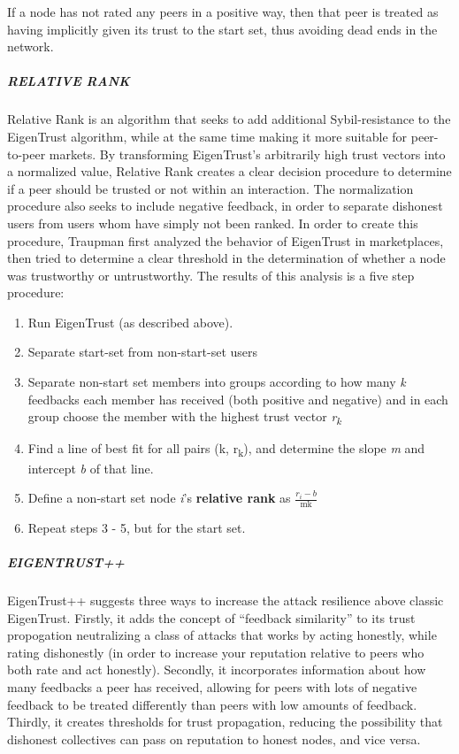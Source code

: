 If a node has not rated any peers in a positive way, then that peer is
treated as having implicitly given its trust to the start set, thus
avoiding dead ends in the network.

\subparagraph{RELATIVE RANK}\label{relative-rank}

Relative Rank is an algorithm that seeks to add additional
Sybil-resistance to the EigenTrust algorithm, while at the same time
making it more suitable for peer-to-peer markets. By transforming
EigenTrust's arbitrarily high trust vectors into a normalized value,
Relative Rank creates a clear decision procedure to determine if a peer
should be trusted or not within an interaction. The normalization
procedure also seeks to include negative feedback, in order to separate
dishonest users from users whom have simply not been ranked. In order to
create this procedure, Traupman first analyzed the behavior of
EigenTrust in marketplaces, then tried to determine a clear threshold in
the determination of whether a node was trustworthy or untrustworthy.
The results of this analysis is a five step procedure:

\begin{enumerate}
\def\labelenumi{\arabic{enumi}.}
\item
  Run EigenTrust (as described above).
\item
  Separate start-set from non-start-set users
\item
  Separate non-start set members into groups according to how many
  \emph{k} feedbacks each member has received (both positive and
  negative) and in each group choose the member with the highest trust
  vector \emph{r\textsubscript{k}}
\item
  Find a line of best fit for all pairs (k, r\textsubscript{k}), and
  determine the slope \emph{m} and intercept \emph{b} of that line.
\item
  Define a non-start set node \emph{i}'s \textbf{relative rank} as
  \(\frac{r_{i} - b}{\text{mk}}\)
\item
  Repeat steps 3 - 5, but for the start
  set.\protect\hypertarget{_bchh8mw27fto}{}{}
\end{enumerate}

\subparagraph{EIGENTRUST++}\label{eigentrust-1}

EigenTrust++ suggests three ways to increase the attack resilience above
classic EigenTrust. Firstly, it adds the concept of ``feedback
similarity'' to its trust propogation neutralizing a class of attacks
that works by acting honestly, while rating dishonestly (in order to
increase your reputation relative to peers who both rate and act
honestly). Secondly, it incorporates information about how many
feedbacks a peer has received, allowing for peers with lots of negative
feedback to be treated differently than peers with low amounts of
feedback. Thirdly, it creates thresholds for trust propagation, reducing
the possibility that dishonest collectives can pass on reputation to
honest nodes, and vice versa.

